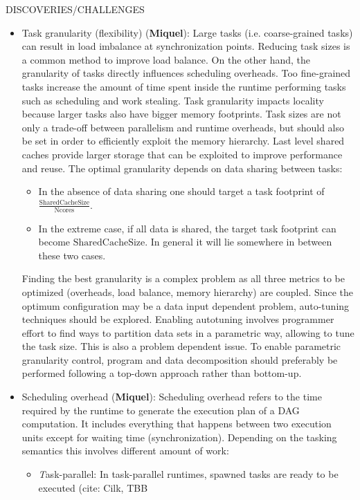 DISCOVERIES/CHALLENGES
	\begin{itemize}
		\item Task granularity (flexibility) (\textbf{Miquel}): 
		Large tasks (i.e. coarse-grained tasks) can result in load imbalance at synchronization points. Reducing task sizes is a common method
		to improve load balance.  On the other hand, the granularity of tasks directly influences scheduling overheads. Too fine-grained tasks
		increase the amount of time spent inside the runtime performing tasks such as scheduling and work stealing.  Task granularity impacts
		locality because larger tasks also have bigger memory footprints. Task sizes are not only a trade-off between parallelism and runtime
		overheads, but should also be set in order to efficiently exploit the memory hierarchy. Last level shared caches provide larger
		storage that can be exploited to improve performance and reuse. The optimal granularity depends on data sharing between tasks:
		\begin{itemize}
			\item In the absence of data sharing one should target a task footprint of $\frac{\mbox{SharedCacheSize}}{\mbox{Ncores}}$. 
			\item In the extreme case, if all data is shared, the target task footprint can become $\mbox{SharedCacheSize}$. In general it
				will lie somewhere in between these two cases.
		\end{itemize} 
		Finding the best granularity is a complex problem as all three metrics to be optimized (overheads, load balance, memory hierarchy) are
		coupled.  Since the optimum configuration may be a data input dependent problem, auto-tuning techniques should be explored.  Enabling
		autotuning involves programmer effort to find ways to partition data sets in a parametric way, allowing to tune the task size. This is
		also a problem dependent issue. To enable parametric granularity control, program and data decomposition should preferably be
		performed following a top-down approach rather than bottom-up.
		\item Scheduling overhead (\textbf{Miquel}):
			Scheduling overhead refers to the time required by the runtime to generate the execution plan of a DAG computation. It
			includes everything that happens between two execution units except for waiting time (synchronization).  Depending on the
			tasking semantics this involves different amount of work:
			\begin{itemize}
				\item  {\emph Task-parallel}: In task-parallel runtimes, spawned tasks are ready to be executed (cite: Cilk, TBB

\end{itemize}
\end{itemize}
